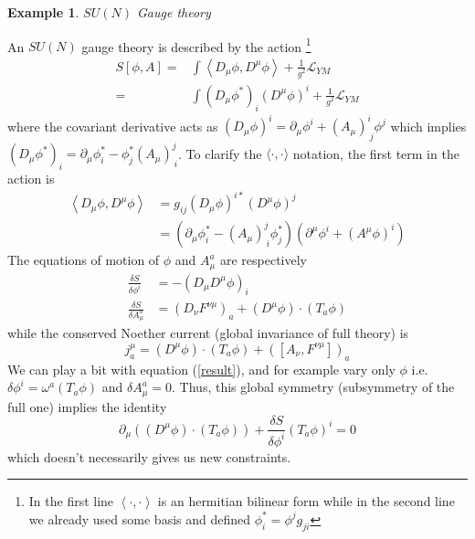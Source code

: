 \documentclass[a4paper,12pt]{article}
\newtheorem{exm}{Example}
\numberwithin{equation}{section}
\numberwithin{thm}{section}
\numberwithin{exm}{section}
\newcommand{\p}{\partial}
\newcommand{\lag}{\mathcal L}
\newcommand{\phic}{\phi^*}
\newcommand{\<}{{\langle}}
\renewcommand{\>}{{\rangle}}
\newcommand{\m}{{\mu}}
\begin{document}
\begin{exm} $SU(N)$ Gauge theory \end{exm}

An $SU(N)$ gauge theory is described by the action%
\footnote{In the first line $\left<\cdot,\cdot\right>$ is an hermitian bilinear form while in the second line we already used some basis and defined $\phic_i=\phi^j g_{ji}$}
	\begin{align}
	S[\phi,A]=&\int \left<D_\mu\phi,D^\mu\phi\right> + \frac{1}{g^2}\lag_{YM} \nonumber \\
	=&\int (D_\mu \phic)_i (D^\mu\phi)^i + \frac{1}{g^2}\lag_{YM}
	\end{align}
where the covariant derivative acts as $(D_\mu\phi)^i=\p_\mu\phi^i+(A_\mu)^i_{\ j} \phi^j$ which implies $(D_\mu\phic)_i=\p_\mu\phic_i-\phic_j(A_\mu)^j_{\ i}$. To clarify the $\<\cdot,\cdot\>$ notation, the first term in the action is
	\begin{align}
	\left<D_\mu \phi,D^\mu \phi\right> & = g_{ij}(D_\mu\phi)^{i*}(D^\mu\phi)^j \nonumber \\
	& =(\p_\mu\phi^*_i-(A_\mu)^j_{\ i}\phi^*_j)(\p^\mu\phi^i+(A^\mu\phi)^i)
	\end{align}
The equations of motion of $\phi$ and $A^a_\m$ are respectively
	\begin{align}
	\frac{\delta S}{\delta\phi^i} & = -(D_\mu D^\mu \phi)_i \\
	\frac{\delta S}{\delta A^a_\mu} & = (D_\nu F^{\nu\mu})_a + (D^\mu\phi)\cdot (T_a\phi)
	\end{align}
while the conserved Noether current (global invariance of full theory) is
	\begin{equation}
	j^\mu_a=(D^\mu\phi)\cdot(T_a\phi)+([A_\nu,F^{\nu\mu}])_a
	\end{equation}
We can play a bit with equation (\ref{result}), and for example vary only $\phi$ i.e. $\delta\phi^i=\omega^a(T_a\phi)$ and $\delta A^a_\mu=0$. Thus, this global symmetry (subsymmetry of the full one) implies the identity
	\begin{equation}
	\p_\mu\left((D^\mu\phi)\cdot(T_a\phi)\right)+\frac{\delta S}{	\delta \phi^i}(T_a\phi)^i=0
	\end{equation}
which doesn't necessarily gives us new constraints.
\end{document}
